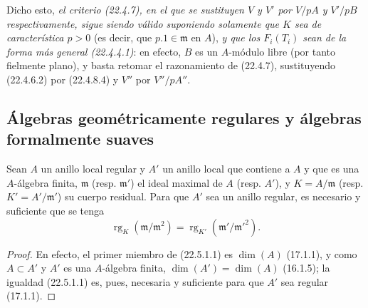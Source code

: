\begin{remark}[22.4.8]
Dicho esto, \emph{el criterio \textup{(22.4.7)}, en el que se sustituyen $V$ y $V'$ por $V/pA$
y $V'/pB$ respectivamente, sigue siendo válido suponiendo solamente que $K$ sea
de característica $p>0$} (es decir, que $p.1\in\mathfrak m$ en
$A$), \emph{y que los $F_i(T_i)$ sean de la forma más general
\textup{(22.4.4.1)}}: en efecto, $B$ es un $A$-módulo libre (por tanto fielmente plano), y
basta retomar el razonamiento de (22.4.7), sustituyendo (22.4.6.2)
por (22.4.8.4) y $V''$ por $V''/pA''$.
\end{remark}

\subsection{Álgebras geométricamente regulares y álgebras formalmente suaves}
\label{subsection:0.22.5-fr}

\begin{proposition}[22.5.1]
\label{0.22.5.1-fr}
Sean $A$ un anillo local regular y $A'$ un anillo local que contiene a $A$ y que
es una $A$-álgebra finita, $\mathfrak m$ \textup{(resp. $\mathfrak m'$)} el ideal maximal
de $A$ \textup{(resp. $A'$)}, y $K=A/\mathfrak m$ \textup{(resp. $K'=A'/\mathfrak m'$)} su cuerpo
residual. Para que $A'$ sea un anillo regular, es necesario y suficiente que se
tenga
\begin{equation}
\label{0.22.5.1.1-fr}
  \operatorname{rg}_K(\mathfrak m/\mathfrak m^2)
  =\operatorname{rg}_{K'}(\mathfrak m'/\mathfrak m'^2).
  \tag{22.5.1.1}
\end{equation}
\end{proposition}

\begin{proof}
En efecto, el primer miembro de (22.5.1.1) es $\dim(A)$ (17.1.1), y como
$A\subset A'$ y $A'$ es una $A$-álgebra finita,
$\dim(A')=\dim(A)$ (16.1.5); la igualdad (22.5.1.1) es, pues, necesaria y
suficiente para que $A'$ sea regular (17.1.1).
\end{proof}

